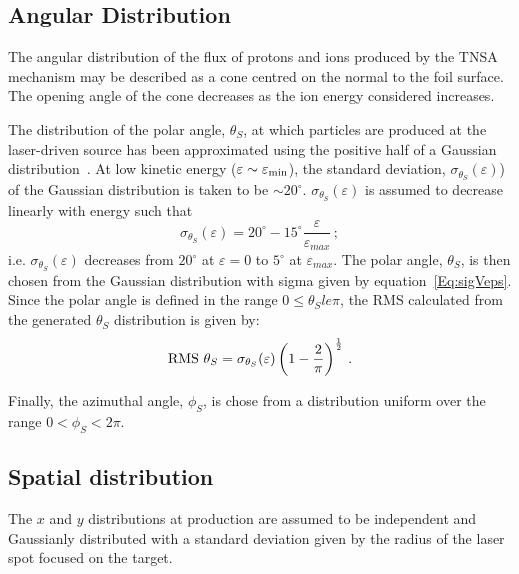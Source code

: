 \subsection{Angular Distribution}

The angular distribution of the flux of protons and ions produced by
the TNSA mechanism may be described as a cone centred on the normal to
the foil surface.
The opening angle of the cone decreases as the ion energy considered
increases.

The distribution of the polar angle, $\theta_S$, at which particles
are produced at the laser-driven source has been approximated using
the positive half of a Gaussian
distribution~\cite{10.1038/s41598-019-41705-0}.
At low kinetic energy ($\varepsilon \sim \varepsilon_{\rm min}$), the
standard deviation, $\sigma_{\theta_S}(\varepsilon)$) of the Gaussian
distribution is taken to be $\sim 20^\circ$.
$\sigma_{\theta_S}(\varepsilon)$ is assumed to decrease linearly with
energy such that
\begin{equation}
  \sigma_{\theta_S}(\varepsilon) =
                20^\circ - 15^\circ \frac{\varepsilon}{\varepsilon_{max}} \, ;
  \label{Eq:sigVeps}
\end{equation}
i.e. $\sigma_{\theta_S}(\varepsilon)$ decreases from $20^\circ$ at
$\varepsilon=0$ to $5^\circ$ at $\varepsilon_{max}$.
The polar angle, $\theta_S$, is then chosen from the Gaussian
distribution with sigma given by equation~\ref{Eq:sigVeps}.
Since the polar angle is defined in the range $0 \le \theta_S le \pi$,
the RMS calculated from the generated $\theta_S$ distribution is given
by:
\begin{equation}
  {\rm RMS}~\theta_S = \sigma_{\theta_S}(\varepsilon)
                      \left( 1 - \frac{2}{\pi} \right)^\frac{1}{2} \, .
  \label{Eq:sigVeps}
\end{equation}


Finally, the azimuthal angle, $\phi_S$, is chose from a distribution
uniform over the range $0 < \phi_S < 2\pi$.

\subsection{Spatial distribution}

The $x$ and $y$ distributions at production are assumed to be
independent and Gaussianly distributed with a standard deviation given
by the radius of the laser spot focused on the target.

